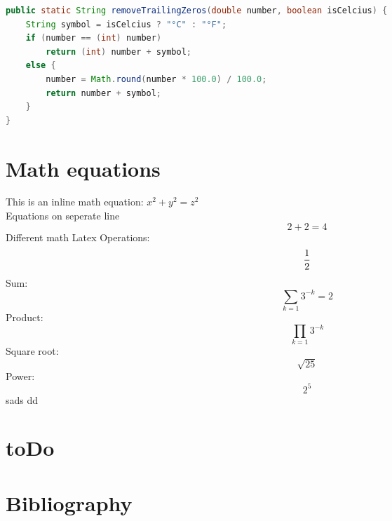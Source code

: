 \documentclass{article}
\begin{document}
\UseRawInputEncoding
\begin{lstlisting}[language = Java]
  public static String removeTrailingZeros(double number, boolean isCelcius) {
    String symbol = isCelcius ? "°C" : "°F";
    if (number == (int) number)
        return (int) number + symbol;
    else {
        number = Math.round(number * 100.0) / 100.0;
        return number + symbol;
    }
}
\end{lstlisting}

\section{Math equations}
This is an inline math equation: \(x^2 + y^2 = z^2\) \\
Equations on seperate line
\begin{equation}
  2+2=4
\end{equation}
Different math Latex Operations:
\begin{equation}
  \frac{1}{2} \\
\end{equation}
Sum:
\begin{equation}
  \sum_{k=1}3^{-k} = 2 
\end{equation}
Product:
\begin{equation}
  \prod_{k=1}3^{-k} 
\end{equation}
Square root:
\begin{equation}
  \sqrt{25}
\end{equation}
Power:
\begin{equation}
  2^5
\end{equation}
sads
dd
\section{toDo}
\listoftodos

\section{Bibliography}
\nocite{*}


\end{document}
